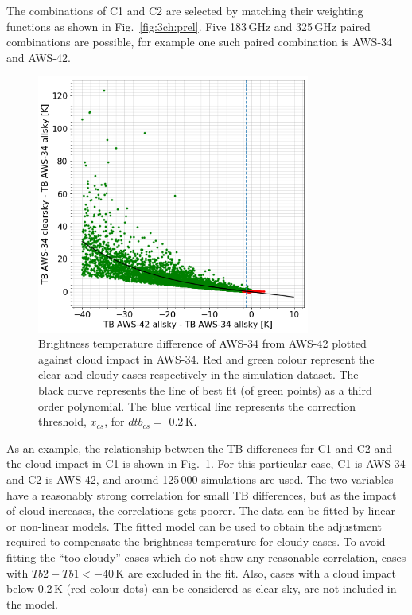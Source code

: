 \documentclass[12pt]{article}
\begin{document}
The combinations of C1 and C2 are selected by matching their weighting
functions as shown in Fig.~\ref{fig:3ch:prel}. Five 183\,GHz and 325\,GHz paired
combinations are possible, for example one such paired combination is AWS-34
and AWS-42.

\begin{figure}[!tb]
	\centering
	\includegraphics[height=85mm]{fit_AWS-34_AWS-42}\hspace{5mm}%
	\caption{Brightness temperature difference of AWS-34 from AWS-42 plotted
      against cloud impact in AWS-34. Red and green colour represent the clear
      and cloudy cases respectively in the simulation dataset. The black curve
      represents the line of best fit (of green points) as a third order
      polynomial. The blue vertical line represents the correction threshold,
      $x_{cs}$, for $dtb_{cs} =$ 0.2\,K. }
	\label{fig:fit:c34-42}
\end{figure}
%

As an example, the relationship between the TB differences for C1 and C2 and
the cloud impact in C1 is shown in Fig.~\ref{fig:fit:c34-42}. For this
particular case, C1 is AWS-34 and C2 is AWS-42, and around 125\,000 simulations
are used. The two variables have a reasonably strong correlation for small TB
differences, but as the impact of cloud increases, the correlations gets
poorer. The data can be fitted by linear or non-linear models. The fitted model
can be used to obtain the adjustment required to compensate the brightness
temperature for cloudy cases. To avoid fitting the ``too cloudy'' cases which
do not show any reasonable correlation, cases with $Tb2-Tb1< -40$\,K are
excluded in the fit. Also, cases with a cloud impact below 0.2\,K (red colour
dots) can be considered as clear-sky, are not included in the model.
\end{document}
